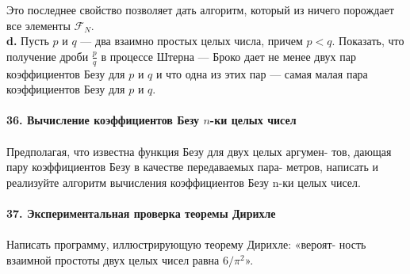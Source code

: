 \documentclass{mai_book}
\begin{document}
Это последнее свойство позволяет дать алгоритм, который из ничего\linebreak
порождает все элементы $\mathcal{F}_N$.\\
\hspace*{10pt}\textbf{d.} Пусть $p$ и $q$ — два взаимно простых целых числа, причем $p < q$.\linebreak
Показать, что получение дроби $\frac{p}{q}$ в процессе Штерна — Броко дает не\linebreak
менее двух пар коэффициентов Безу для $p$ и $q$ и что одна из этих пар —\linebreak
самая малая пара коэффициентов Безу для $p$ и $q$.
\\
\\
\noindent\textbf{36. Вычисление коэффициентов Безу $n$-ки целых чисел}\\\\
\hspace*{10pt} Предполагая, что известна функция Безу для двух целых аргумен-\linebreak
тов, дающая пару коэффициентов Безу в качестве передаваемых пара-\linebreak
метров, написать и реализуйте алгоритм вычисления коэффициентов\linebreak
Безу n-ки целых чисел.
\\
\\
\noindent\textbf{37. Экспериментальная проверка теоремы Дирихле}\\\\
\hspace*{10pt} Написать программу, иллюстрирующую теорему Дирихле: «вероят-\linebreak
ность взаимной простоты двух целых чисел равна $6/\pi^2$».\pagebreak

\end{document}
